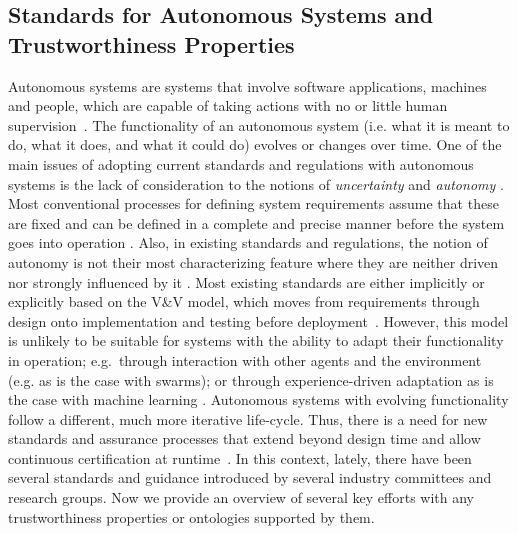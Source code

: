 \subsection{Standards for Autonomous Systems and Trustworthiness Properties}
Autonomous systems are systems that involve software applications, machines and people, which are capable of taking actions with no or little human supervision~\cite{Murukannaiah2020}. 
The functionality of an autonomous system (i.e. what it is meant to do, what it does, and what it could do) evolves or changes over time. 
One of the main issues of adopting current standards and regulations with autonomous systems is the lack of consideration to the notions of \textit{uncertainty} and \textit{autonomy} \cite{Fisher2020}. 
Most conventional processes for defining system requirements assume that these are fixed and can be defined in a complete and precise manner before the system goes into operation \cite{Abeywickrama2022}. 
Also, in existing standards and regulations, the notion of autonomy is not their most characterizing feature where they are neither driven nor strongly influenced by it \cite{Fisher2020}. 
Most existing standards are either implicitly or explicitly based on the V\&V model, which moves from requirements through design onto implementation and testing before deployment~\cite{Jia2021}. 
However, this model is unlikely to be suitable for systems with the ability to adapt their functionality in operation; e.g.\ through interaction with other agents and the environment (e.g. as is the case with swarms); or through experience-driven adaptation as is the case with machine learning \cite{Abeywickrama2022}. 
Autonomous systems with evolving functionality follow a different, much more iterative life-cycle. 
Thus, there is a need for new standards and assurance processes that extend beyond design time and allow continuous certification at runtime~\cite{Rushby2008}. 
In this context, lately, there have been several standards and guidance introduced by several industry committees and research groups. 
Now we provide an overview of several key efforts with any trustworthiness properties or ontologies supported by them.

